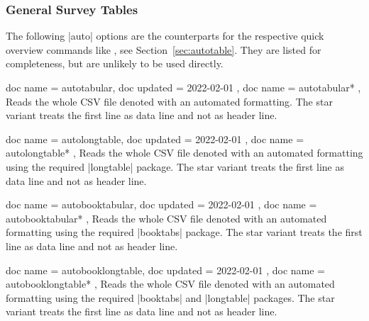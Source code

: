 \documentclass[a4paper,11pt]{ltxdoc}
\begin{document}
\clearpage
\subsubsection{General Survey Tables}\label{subsubsec:table_survey}

The following |auto| options are the counterparts for the respective quick
overview commands like , see Section~\ref{sec:autotable}.
They are listed for
completeness, but are unlikely to be used directly.

\begin{docCsvKeys}[
    doc parameter   = {=\meta{file name}},
    doc description = no default,
  ]
  {
    { doc name = autotabular, doc updated = {2022-02-01} },
    { doc name = autotabular* },
  }
  Reads the whole CSV file denoted  with an automated formatting.
  The star variant treats the first line as data line and not as header line.
\end{docCsvKeys}


\begin{docCsvKeys}[
    doc parameter   = {=\meta{file name}},
    doc description = no default,
  ]
  {
    { doc name = autolongtable, doc updated = {2022-02-01}  },
    { doc name = autolongtable* },
  }
  Reads the whole CSV file denoted  with an automated formatting
  using the required |longtable| package.
  The star variant treats the first line as data line and not as header line.
\end{docCsvKeys}


\begin{docCsvKeys}[
    doc parameter   = {=\meta{file name}},
    doc description = no default,
  ]
  {
    { doc name = autobooktabular, doc updated = {2022-02-01}  },
    { doc name = autobooktabular* },
  }
  Reads the whole CSV file denoted  with an automated formatting
  using the required |booktabs| package.
  The star variant treats the first line as data line and not as header line.
\end{docCsvKeys}


\begin{docCsvKeys}[
    doc parameter   = {=\meta{file name}},
    doc description = no default,
  ]
  {
    { doc name = autobooklongtable, doc updated = {2022-02-01}  },
    { doc name = autobooklongtable* },
  }
  Reads the whole CSV file denoted  with an automated formatting
  using the required |booktabs| and |longtable| packages.
  The star variant treats the first line as data line and not as header line.
\end{docCsvKeys}
\end{document}
